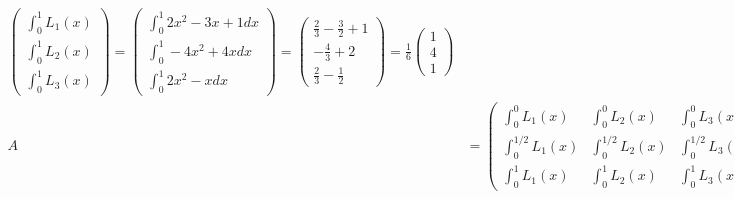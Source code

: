 \begin{solution}
\begin{enumerate}[label = \textbf{\alph*)}]
\begin{align*}
\begin{pmatrix}
      \int_0^1 L_1(x) \\ \int_0^1 L_2(x) \\ \int_0^1 L_3(x)
    \end{pmatrix}
    = \begin{pmatrix}
      \int_0^1 2x^2 - 3x + 1 dx \\
      \int_0^1 -4x^2 + 4x dx \\
      \int_0^1 2x^2 - x dx
    \end{pmatrix}
    = \begin{pmatrix}
       \frac{2}{3} - \frac{3}{2} + 1 \\-\frac{4}{3} + 2 \\ \frac{2}{3} - \frac{1}{2}
    \end{pmatrix}
    = \frac{1}{6}\begin{pmatrix}
      1 \\ 4 \\ 1
    \end{pmatrix} \\
    A &= \begin{pmatrix}
      \int_0^0 L_1(x) & \int_0^0 L_2(x) & \int_0^0 L_3(x)\\
      \int_0^{1/2} L_1(x) & \int_0^{1/2} L_2(x) & \int_0^{1/2} L_3(x)\\
      \int_0^1 L_1(x) & \int_0^1 L_2(x) & \int_0^1 L_3(x)
    \end{pmatrix}
    = \frac{1}{24}\begin{pmatrix}
      0 & 0 & 0\\
      5 & 8 & -1\\
      4 & 16 & 4
    \end{pmatrix}
  \end{align*}
\end{enumerate}
\end{solution}
